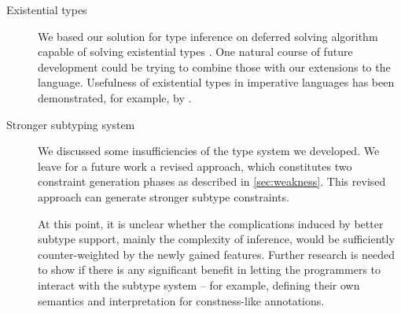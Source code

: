 \begin{description}
    \item[Existential types] We based our solution for type inference on deferred solving algorithm capable of solving existential types \cite{vytiniotis2011outsidein}. One natural course of future development could be trying to combine those with our extensions to the language. Usefulness of existential types in imperative languages has been demonstrated, for example, by \citet{grossman2002existential}.

    \item[Stronger subtyping system] We discussed some insufficiencies of the type system we developed. We leave for a future work a revised approach, which constitutes two constraint generation phases as described in \cref{sec:weakness}. This revised approach can generate stronger subtype constraints.

    At this point, it is unclear whether the complications induced by better subtype support, mainly the complexity of inference, would be sufficiently counter-weighted by the newly gained features. Further research is needed to show if there is any significant benefit in letting the programmers to interact with the subtype system -- for example, defining their own semantics and interpretation for constness-like annotations.
\end{description}
